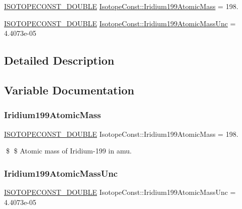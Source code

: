 \begin{DoxyCompactItemize}
\item 
\mbox{\hyperlink{group___isotope_const-_macros_ga8f45a7272ce02c0b4c65c44636ed719a}{I\+S\+O\+T\+O\+P\+E\+C\+O\+N\+S\+T\+\_\+\+D\+O\+U\+B\+LE}} \mbox{\hyperlink{group___isotope_const-_iridium-_ir199_gab2f12d6b6d697f26b266e2470543bc67}{Isotope\+Const\+::\+Iridium199\+Atomic\+Mass}} = 198.
\item 
\mbox{\hyperlink{group___isotope_const-_macros_ga8f45a7272ce02c0b4c65c44636ed719a}{I\+S\+O\+T\+O\+P\+E\+C\+O\+N\+S\+T\+\_\+\+D\+O\+U\+B\+LE}} \mbox{\hyperlink{group___isotope_const-_iridium-_ir199_gac0eb0f3015c01be7773518d6bd49bf2c}{Isotope\+Const\+::\+Iridium199\+Atomic\+Mass\+Unc}} = 4.\+4073e-\/05
\end{DoxyCompactItemize}


\subsection{Detailed Description}


\subsection{Variable Documentation}
\mbox{\label{group___isotope_const-_iridium-_ir199_gab2f12d6b6d697f26b266e2470543bc67}} 
\subsubsection{\texorpdfstring{Iridium199\+Atomic\+Mass}{Iridium199AtomicMass}}
{\footnotesize\ttfamily \mbox{\hyperlink{group___isotope_const-_macros_ga8f45a7272ce02c0b4c65c44636ed719a}{I\+S\+O\+T\+O\+P\+E\+C\+O\+N\+S\+T\+\_\+\+D\+O\+U\+B\+LE}} Isotope\+Const\+::\+Iridium199\+Atomic\+Mass = 198.}

\$ \$ Atomic mass of Iridium-\/199 in amu. \mbox{\label{group___isotope_const-_iridium-_ir199_gac0eb0f3015c01be7773518d6bd49bf2c}} 
\subsubsection{\texorpdfstring{Iridium199\+Atomic\+Mass\+Unc}{Iridium199AtomicMassUnc}}
{\footnotesize\ttfamily \mbox{\hyperlink{group___isotope_const-_macros_ga8f45a7272ce02c0b4c65c44636ed719a}{I\+S\+O\+T\+O\+P\+E\+C\+O\+N\+S\+T\+\_\+\+D\+O\+U\+B\+LE}} Isotope\+Const\+::\+Iridium199\+Atomic\+Mass\+Unc = 4.\+4073e-\/05}

